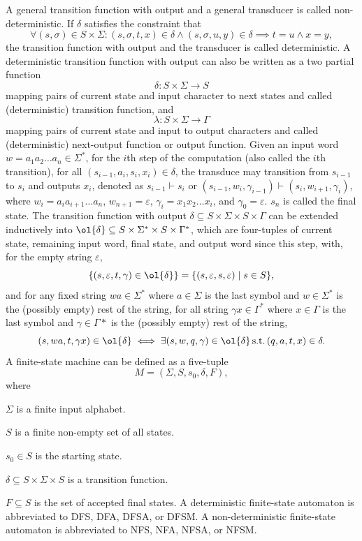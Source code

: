 \documentclass[a4paper,12pt]{article}
\begin{document}
A general transition function with output and a general transducer is called non-deterministic. If $\delta$ satisfies the constraint that
\[\forall (s,\sigma)\in S\times\Sigma\colon(s,\sigma,t,x)\in\delta\land(s,\sigma,u,y)\in\delta\implies t=u\land x=y,\]
the transition function with output and the transducer is called deterministic. A deterministic transition function with output can also be written as a two partial function
\[\delta\colon S\times\Sigma\to S\]
mapping pairs of current state and input character to next states and called (deterministic) transition function, and
\[\lambda\colon S\times\Sigma\to\Gamma\]
mapping pairs of current state and input to output characters and called (deterministic) next-output function or output function.
\eit
Given an input word $w=a_1a_2\ldots a_n\in\Sigma^*$, for the $i$th step of the computation (also called the $i$th transition), for all $(s_{i-1},a_i,s_i,x_i)\in\delta$, the transduce may transition from $s_{i-1}$ to $s_i$ and outputs $x_i$, denoted as $s_{i-1}\vdash s_i$ or $(s_{i-1},w_i,\gamma_{i-1})\vdash (s_i,w_{i+1},\gamma_i)$, where $w_i=a_ia_{i+1}\ldots a_n$, $w_{n+1}=\varepsilon$, $\gamma_i=x_1x_2\ldots x_i$, and $\gamma_0=\varepsilon$. $s_n$ is called the final state.
The transition function with output $\delta\subseteq S\times\Sigma\times S\times\Gamma$ can be extended inductively into $\ol{\delta}\subseteq S\times\Sigma^*\times S\times\Gamma^*$, which are four-tuples of current state, remaining input word, final state, and output word since this step, with, for the empty string $\varepsilon$,
\[\{(s,\varepsilon,t,\gamma)\in\ol{\delta}\}=\{(s,\varepsilon,s,\varepsilon)\mid s\in S\},\]
and for any fixed string $wa\in\Sigma^*$ where $a\in\Sigma$ is the last symbol and $w\in\Sigma^*$ is the (possibly empty) rest of the string, for all string $\gamma x\in\Gamma^*$ where $x\in\Gamma$ is the last symbol and $\gamma\in\Gamma*$ is the (possibly empty) rest of the string,
\[(s,wa,t,\gamma x)\in\ol{\delta}\iff\exists(s,w,q,\gamma)\in\ol{\delta}\,\text{s.t.}\,(q,a,t,x)\in\delta.\]
A finite-state machine can be defined as a five-tuple
\[M=(\Sigma,S,s_0,\delta,F),\]
where
\bit
\item $\Sigma$ is a finite input alphabet.
\item $S$ is a finite non-empty set of all states.
\item $s_0\in S$ is the starting state.
\item $\delta\subseteq S\times\Sigma\times S$ is a transition function.
\item $F\subseteq S$ is the set of accepted final states.
\eit
A deterministic finite-state automaton is abbreviated to DFS, DFA, DFSA, or DFSM. A non-deterministic finite-state automaton is abbreviated to NFS, NFA, NFSA, or NFSM.
\end{document}
